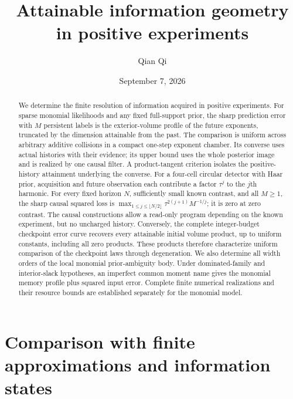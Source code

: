 \documentclass[11pt]{amsart}
\title[Attainable information geometry]{Attainable information geometry\\ in positive experiments}
\author{Qian Qi}
\date{September 7, 2026}
\theoremstyle{definition}\newtheorem{definition}[theorem]{Definition}
\theoremstyle{remark}\newtheorem{remark}[theorem]{Remark}
\begin{document}
\begin{abstract}
We determine the finite resolution of information acquired in positive
experiments. For sparse monomial likelihoods and any fixed full-support
prior, the sharp prediction error with $M$ persistent labels is the
exterior-volume profile of the future exponents, truncated by the
dimension attainable from the past. The comparison is uniform across
arbitrary additive collisions in a compact one-step exponent chamber.
Its converse uses actual histories with their evidence; its upper bound
uses the whole posterior image and is realized by one causal filter.
A product-tangent criterion isolates the positive-history attainment
underlying the converse. For a four-cell circular detector with Haar
prior, acquisition and future observation each contribute a factor
$\tau^j$ to the $j$th harmonic. For every fixed horizon $N$, sufficiently
small known contrast, and all $M\ge1$, the sharp causal squared loss is
$\max_{1\le j\le\lfloor N/2\rfloor}\tau^{2(j+1)}M^{-1/j}$;
it is zero at zero contrast. The causal constructions allow a read-only
program depending on the known experiment, but no uncharged history.
Conversely, the complete integer-budget checkpoint error curve recovers
every attainable initial volume product, up to uniform constants,
including all zero products. These products therefore characterize
uniform comparison of the checkpoint laws through degeneration.
We also determine all width orders of the local monomial prior-ambiguity
body. Under dominated-family and interior-slack hypotheses, an imperfect
common moment name gives the monomial memory profile plus squared input
error. Complete finite numerical realizations and their resource bounds
are established separately for the monomial model.
\end{abstract}
\maketitle













\appendix












\section{Comparison with finite approximations and information states}
\label{sec:literature-comparison}


\end{document}
